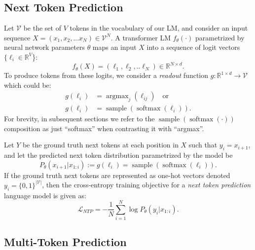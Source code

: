 \documentclass{article}
\theoremstyle{plain}
\theoremstyle{definition}
\theoremstyle{remark}
\begin{document}
\subsection{Next Token Prediction}\label{sec:prelim-ntp}
Let $\mathcal{V}$ be the set of $V$ tokens in the vocabulary of our LM, and consider an input sequence $X = (x_1,x_2,...x_N) \in \mathcal{V}^N$. A transformer LM $f_\theta(\cdot)$ parametrized by neural network parameters $\theta$ maps an input $X$ into a sequence of logit vectors $\{\ell_i\in \mathbb{R}^V$\}: 
\begin{equation*}
f_\theta(X) = (\ell_1,\ell_2,..\ell_N) \in \mathbb{R}^{N \times d}.
\end{equation*}
To produce tokens from these logits, we consider a \textit{readout} function $g: \mathbb{R}^{1 \times d} \to \mathcal{V}$ which could be:
\begin{align*}
g(\ell_i) &= \operatorname{argmax}_j(\ell_{ij}) \quad \text{or} \\
g(\ell_i) &= \operatorname{sample}(\operatorname{softmax}(\ell_i)).
\end{align*}
For brevity, in subsequent sections we refer to the $\operatorname{sample}(\operatorname{softmax}(\cdot))$ composition as just ``softmax'' when contrasting it with ``argmax''.

Let $Y$ be the ground truth next tokens at each position in $X$ such that $y_i = x_{i+1}$, and let the predicted next token distribution parametrized by the model be 
\begin{equation*}
P_\theta(x_{i+1}| x_{1:i}) := g(\ell_i) = \operatorname{sample}(\operatorname{softmax}(\ell_i)).
\end{equation*}
If the ground truth next tokens are represented as one-hot vectors denoted $y_i= \{0,1\}^{|\mathcal{V}|}$, then the cross-entropy training objective for a \textit{next token prediction} language model is given as:
\begin{equation}\label{eq:ntp-ce-sum-log}
\mathcal{L}_{NTP} = - \frac{1}{N}\sum_{i=1}^{N} \log P_\theta(y_i | x_{1:i}).
\end{equation}

\subsection{Multi-Token Prediction}\label{sec:prelim-mtp}
\end{document}
